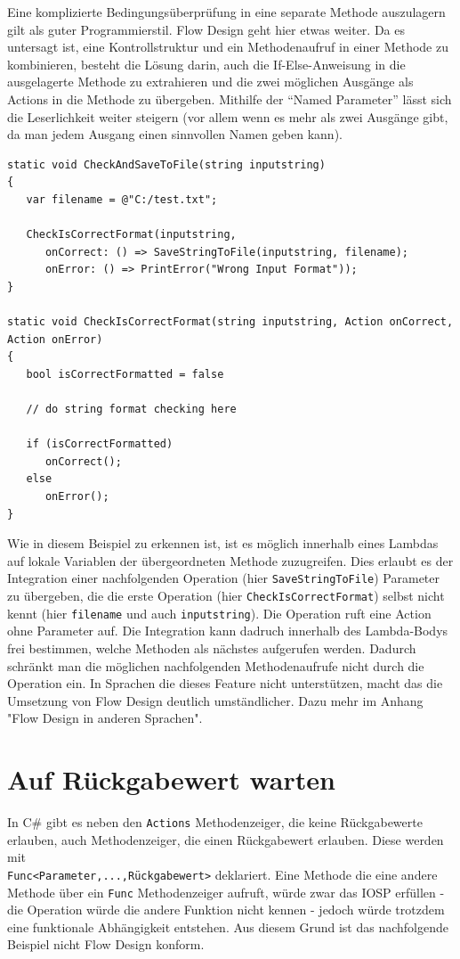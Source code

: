 Eine komplizierte Bedingungsüberprüfung in eine separate Methode auszulagern
gilt als guter Programmierstil. Flow Design geht hier etwas weiter. Da es
untersagt ist, eine Kontrollstruktur und ein Methodenaufruf in einer
Methode zu kombinieren, besteht die Lösung darin, auch die If-Else-Anweisung in
die ausgelagerte Methode zu extrahieren und die zwei möglichen Ausgänge als Actions
in die Methode zu übergeben. Mithilfe der \enquote{Named Parameter} lässt sich die
Leserlichkeit weiter steigern (vor allem wenn es mehr als zwei Ausgänge
gibt, da man jedem Ausgang einen sinnvollen Namen geben kann).

\begin{lstlisting}
static void CheckAndSaveToFile(string inputstring)
{
   var filename = @"C:/test.txt";

   CheckIsCorrectFormat(inputstring, 
      onCorrect: () => SaveStringToFile(inputstring, filename);
      onError: () => PrintError("Wrong Input Format"));
}

static void CheckIsCorrectFormat(string inputstring, Action onCorrect, Action onError)
{
   bool isCorrectFormatted = false

   // do string format checking here

   if (isCorrectFormatted) 
      onCorrect();
   else
      onError();
}
\end{lstlisting}

Wie in diesem Beispiel zu erkennen ist, ist es möglich innerhalb eines
Lambdas auf lokale Variablen der übergeordneten Methode zuzugreifen. Dies
erlaubt es der Integration einer nachfolgenden Operation (hier \texttt{SaveStringToFile}) Parameter zu übergeben,
die die erste Operation (hier \texttt{CheckIsCorrectFormat}) selbst nicht kennt (hier
\texttt{filename} und auch \texttt{inputstring}). Die Operation ruft eine Action ohne
Parameter auf. Die Integration kann dadruch innerhalb des Lambda-Bodys frei
bestimmen, welche Methoden als nächstes aufgerufen werden.
Dadurch schränkt man die möglichen nachfolgenden Methodenaufrufe nicht durch
die Operation ein. In Sprachen die dieses Feature
nicht unterstützen, macht das die Umsetzung von Flow Design deutlich umständlicher.
Dazu mehr im Anhang "Flow Design in anderen Sprachen".


\section{Auf Rückgabewert warten}

In C\# gibt es neben den \texttt{Actions} Methodenzeiger, die keine Rückgabewerte 
erlauben, auch Methodenzeiger, die einen Rückgabewert erlauben.
Diese werden mit\\\texttt{Func<Parameter,...,Rückgabewert>} deklariert.
Eine Methode die eine andere Methode über ein \texttt{Func} Methodenzeiger aufruft,
würde zwar das IOSP erfüllen - die Operation würde die andere Funktion nicht
kennen - jedoch würde trotzdem eine funktionale Abhängigkeit entstehen.
Aus diesem Grund ist das nachfolgende Beispiel nicht Flow Design konform.

